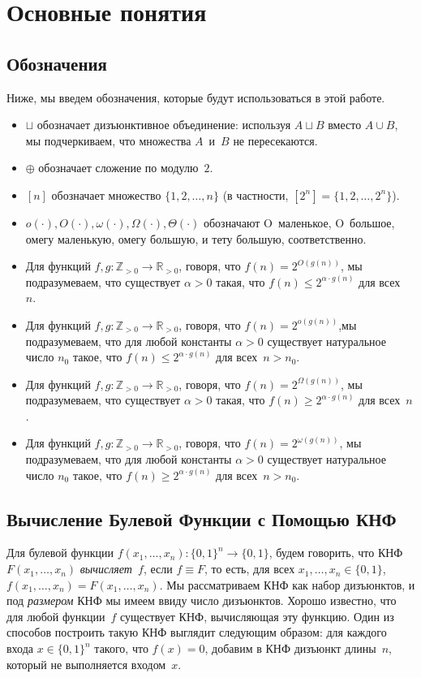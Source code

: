 \section{Основные понятия}

\subsection{Обозначения}

Ниже, мы введем обозначения, которые будут использоваться в этой работе.

\begin{itemize}
	\item $\sqcup$ обозначает дизъюнктивное объединение: используя $A\sqcup B$ вместо $A\cup B$, мы подчеркиваем, что множества $A$~и~$B$ не пересекаются. 
	\item $\oplus$ обозначает сложение по модулю~$2$.
	\item $[n]$ обозначает множество $\{1, 2, \dotsc, n\}$ (в частности, $[2^n] = \{1, 2, \dotsc, 2^n\}$).
	\item $o(\cdot), O(\cdot), \omega(\cdot), \Omega(\cdot), \Theta(\cdot)$ обозначают O~маленькое, 
	O~большое, омегу маленькую, омегу большую, и тету большую, соответственно.
	\item Для функций $f,g \colon \mathbb{Z}_{>0} \to \mathbb{R}_{>0}$, говоря, что $f(n) = 2^{O(g(n))}$, мы подразумеваем, что существует $\alpha > 0$ такая, что
	$f(n) \le 2^{\alpha \cdot g(n)}$ 
	для всех ~$n$.
	\item Для функций $f,g \colon \mathbb{Z}_{>0} \to \mathbb{R}_{>0}$, говоря, что $f(n) = 2^{o(g(n))}$,мы подразумеваем, что для любой константы $\alpha > 0$ существует натуральное число $n_0$ такое, что
	$f(n) \le 2^{\alpha \cdot g(n)}$ 
	для всех~$n > n_0$.
	\item Для функций $f,g \colon \mathbb{Z}_{>0} \to \mathbb{R}_{>0}$, говоря, что $f(n) = 2^{\Omega(g(n))}$, мы подразумеваем, что существует $\alpha > 0$ такая, что 
	$f(n) \ge 2^{\alpha \cdot g(n)}$ 
	для всех~$n$.
	\item Для функций $f,g \colon \mathbb{Z}_{>0} \to \mathbb{R}_{>0}$, говоря, что $f(n) = 2^{\omega(g(n))}$, мы подразумеваем, что для любой константы $\alpha > 0$ существует натуральное число $n_0$ такое, что 
	$f(n) \ge 2^{\alpha \cdot g(n)}$ 
	для всех~$n > n_0$.
\end{itemize}

\subsection{Вычисление Булевой Функции с Помощью КНФ}
Для булевой функции $f(x_1, \dotsc, x_n) \colon \{0,1\}^n \to \{0,1\}$, будем говорить, что КНФ~$F(x_1, \dotsc, x_n)$ \emph{вычисляет~$f$}, если $f \equiv F$, то есть, для всех $x_1, \dotsc, x_n \in \{0,1\}$, $f(x_1, \dotsc, x_n)=F(x_1, \dotsc, x_n)$.
Мы рассматриваем КНФ как набор дизъюнктов, и под \emph{размером} КНФ мы имеем ввиду число дизъюнктов.
Хорошо известно, что для любой функции~$f$ существует КНФ, вычисляющая эту функцию. Один из способов построить такую КНФ выглядит следующим образом: для каждого входа $x \in \{0,1\}^n$ такого, что $f(x)=0$, добавим в КНФ дизъюнкт длины~$n$, который не выполняется входом~$x$.

